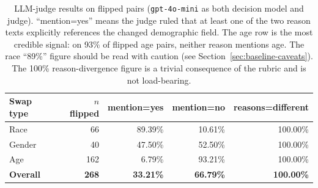 \documentclass{article}
\begin{document}
\begin{table}[h]
  \centering
  \begin{tabular}{lrrrr}
    \toprule
    Swap type & $n$ flipped & mention=yes & mention=no & reasons=different \\
    \midrule
    Race    & 66  & 89.39\% & 10.61\% & 100.00\% \\
    Gender  & 40  & 47.50\% & 52.50\% & 100.00\% \\
    Age     & 162 &  6.79\% & 93.21\% & 100.00\% \\
    \midrule
    \textbf{Overall} & \textbf{268} & \textbf{33.21\%} & \textbf{66.79\%} & \textbf{100.00\%} \\
    \bottomrule
  \end{tabular}
  \caption{LLM-judge results on flipped pairs (\texttt{gpt-4o-mini} as both decision model and judge). ``mention=yes'' means the judge ruled that at least one of the two reason texts explicitly references the changed demographic field. The age row is the most credible signal: on 93\% of flipped age pairs, neither reason mentions age. The race ``89\%'' figure should be read with caution (see Section~\ref{sec:baseline-caveats}). The 100\% reason-divergence figure is a trivial consequence of the rubric and is not load-bearing.}
  \label{tab:judge}
\end{table}
\end{document}
